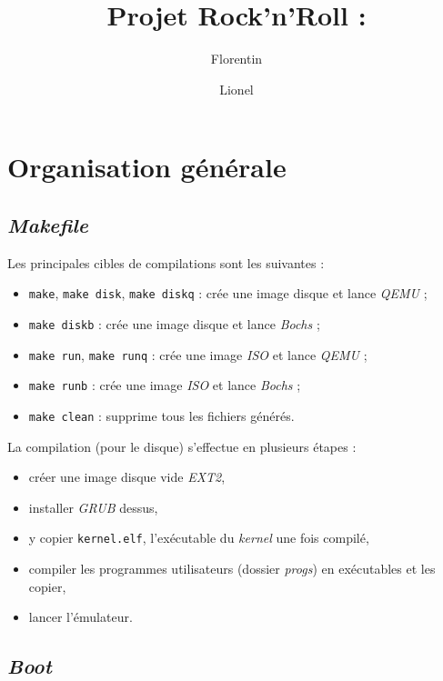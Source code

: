 \documentclass[a4paper, 10pt, french]{article}
\title{Projet Rock'n'Roll : \mariobros}
\author{Florentin \bsc{Guth} \and Lionel \bsc{Zoubritzky}}
\newcommand{\source}[5]{
  \begin{table}[H]
    \centering
    \inputminted[frame=lines,linenos,style=colorful,fontfamily=tt,breaklines,autogobble,firstline=#3,firstnumber=#3,lastline=#4,label={#2[#3--#4]}]{#1}{../src/#2}
    \captionsetup{name=Listing,labelformat=listing,labelsep=endash,labelfont={sc}}
    \caption{#5}
  \end{table}
  }
\newcommand{\codeC}[1]{\texttt{#1}}
\newcommand{\code}[1]{\texttt{#1}}
\newcommand{\foreign}[1]{\emph{#1}}
\begin{document}
\maketitle


\tableofcontents

\clearpage

%
% 
% 
% 

\section{Organisation générale}

\subsection{\foreign{Makefile}}

Les principales cibles de compilations sont les suivantes :
\begin{itemize}
 \item \code{make}, \code{make disk}, \code{make diskq} : crée une image disque et lance \foreign{QEMU} ;
 \item \code{make diskb} : crée une image disque et lance \foreign{Bochs} ;
 \item \code{make run}, \code{make runq} : crée une image \foreign{ISO} et lance \foreign{QEMU} ;
 \item \code{make runb} : crée une image \foreign{ISO} et lance \foreign{Bochs} ;
 \item \code{make clean} : supprime tous les fichiers générés.
\end{itemize}

La compilation (pour le disque) s'effectue en plusieurs étapes :
\begin{itemize}
 \item créer une image disque vide \foreign{EXT2},
 \item installer \foreign{GRUB} dessus,
 \item y copier \code{kernel.elf}, l'exécutable du \foreign{kernel} une fois compilé,
 \item compiler les programmes utilisateurs (dossier \foreign{progs}) en exécutables et les copier,
 \item lancer l'émulateur.
\end{itemize}



\subsection{\foreign{Boot}}
\end{document}
